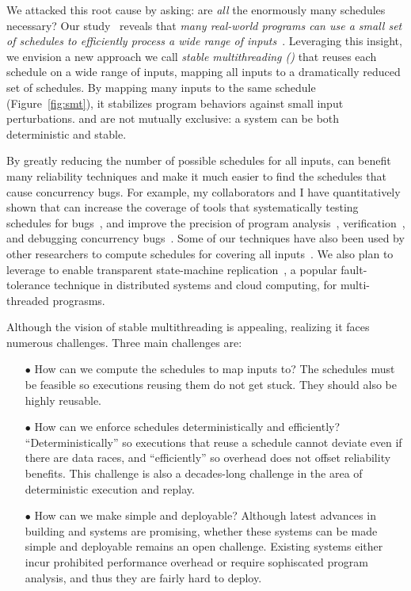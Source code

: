 We attacked this root cause by asking: are \emph{all} the enormously
many schedules necessary?  Our study~\cite{cui:tern:osdi10, dthreads:sosp11} reveals that \emph{many real-world
  programs can use a small set of schedules to efficiently process a wide
  range of inputs}~\cite{cui:tern:osdi10}.  Leveraging this insight, we
envision a new approach we call \emph{stable multithreading (\smt)}
that reuses each schedule on a wide range of inputs, mapping all inputs to a dramatically
reduced set of schedules. By mapping many inputs to the same schedule (Figure~\ref{fig:smt}),
it stabilizes program behaviors against small input perturbations. 
\smt and \dmt are not mutually exclusive: a system can be both
deterministic and stable.

By greatly reducing the number of possible schedules for all inputs, \smt can benefit many reliability 
techniques and make it much easier to find the schedules that cause concurrency 
bugs. For example, my collaborators and I have quantitatively shown that \smt can 
increase the coverage of tools that systematically testing schedules for 
bugs~\cite{parrot:sosp13, dbug:spin11, modist:nsdi09}, and improve the precision 
of program analysis~\cite{wu:pldi12}, verification~\cite{wu:pldi12}, and 
debugging concurrency bugs~\cite{cui:tern:osdi10}. Some of our \smt techniques have 
also been used by other researchers to compute schedules for covering all 
inputs~\cite{bergan:oopsla13}. We also plan to leverage \smt to enable transparent 
state-machine replication~\cite{paxos}, a popular fault-tolerance technique in 
distributed systems and cloud computing, for multi-threaded prograsms.

Although the vision of stable multithreading is appealing, realizing it
faces numerous challenges.  Three main challenges are:

\begin{enumerate}

\item[$\bullet$] How can we compute the schedules to map inputs to?  The 
schedules
  must be feasible so executions reusing them do not get stuck.
  They should also be highly reusable.

\item[$\bullet$] How can we enforce schedules deterministically and
  efficiently?  ``Deterministically'' so executions that reuse a schedule
  cannot deviate even if there are data races, and ``efficiently'' so
  overhead does not offset reliability benefits.
  This challenge is also a decades-long challenge in the area of
  deterministic execution and replay.

\item[$\bullet$] How can we make \smt simple and deployable? Although latest 
advances in building \smt and \dmt systems are promising, whether these systems
can be made simple and deployable remains an open challenge. Existing 
systems either incur prohibited performance overhead or require sophiscated program analysis,
and thus they are fairly hard to deploy. 

\end{enumerate}


